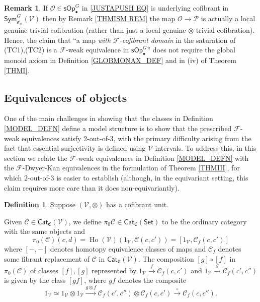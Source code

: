 \documentclass[a4paper,10pt
,draft
]{article}%
\numberwithin{equation}{section}
\numberwithin{figure}{section}
\theoremstyle{definition} %
\newtheorem{definition}[equation]{Definition}%
\newtheorem{remark}[equation]{Remark}%
\newcommand{\Cat}{\mathsf{Cat}}
\DeclareMathOperator{\Ho}{Ho}
\newcommand{\F}{\ensuremath{\mathcal F}}
\newcommand{\V}{\ensuremath{\mathcal V}}
\renewcommand{\O}{\ensuremath{\mathcal O}}
\renewcommand{\P}{\ensuremath{\mathcal P}}
\newcommand{\1}{\ensuremath{\mathbbm 1}}%
\begin{document}
\begin{remark}\label{JCELLSM REM}
	If $\O \in \mathsf{sOp}^G_{\bullet}$
	in \eqref{JUSTAPUSH EQ}
	is underlying cofibrant in $\mathsf{Sym}^G_{\mathfrak{C}_{\O}}(\V)$
	then by Remark \ref{THMISM REM}
	the map $\O \to \P$
	is actually a local genuine trivial cofibration 
	(rather than just a local genuine $\otimes$-trivial cofibration).
	Hence, the claim that 
	``a map \emph{with $\F$-cofibrant domain} in the saturation
	of (TC1),(TC2) is a $\F$-weak equivalence in
	$\mathsf{sOp}^G_{\bullet}$'' 
	does not require the global monoid axiom
	in Definition \ref{GLOBMONAX_DEF} and in (iv) of Theorem \ref{THMI}.
\end{remark}







\subsection{Equivalences of objects}\label{EQUIVOBJ_SEC}



One of the main challenges in showing that the classes in Definition \ref{MODEL_DEFN} define a model structure
is to show that the prescribed 
$\F$-weak equivalences satisfy $2$-out-of-$3$,
with the primary difficulty arising from the fact that essential surjectivity is 
defined using $\V$-intervals.
%
To address this, in this section we relate the $\F$-weak equivalences
in Definition \ref{MODEL_DEFN} with the $\F$-Dwyer-Kan equivalences
in the formulation of Theorem \ref{THMIII},
for which $2$-out-of-$3$ is easier to establish
(although, in the equivariant setting, 
this claim requires more care than it does non-equivariantly).


\begin{definition}\label{HTPY_DEFN}
	Suppose $(\V,\otimes)$ has a cofibrant unit.

	Given $\mathcal C \in \Cat_{\mathfrak{C}}(\V)$,
	we define $\pi_0 \mathcal C \in \Cat_{\mathfrak{C}}(\mathsf{Set})$ 
	to be the ordinary category with the same objects and
\[
	\pi_0(\mathcal{C})(c,d)=
	\Ho(\V)(1_\V, \mathcal C(c,c'))=
	[1_\V, \mathcal{C}_f(c,c')]
\]
where $[-,-]$ denotes homotopy equivalence classes of maps
and $\mathcal{C}_f$ denotes some fibrant replacement of
$\mathcal C$ in $\Cat_{\mathfrak{C}}(\V)$.
The composition $[g]\circ [f]$
in $\pi_0(\mathcal{C})$
of classes $[f],[g]$
represented by
$1_{\mathcal{V}} \xrightarrow{f} \mathcal{C}_f({c,c'})$
and 
$1_{\mathcal{V}} \xrightarrow{g} \mathcal{C}_f({c',c''})$
is given by the class $[gf]$, where $gf$ denotes the composite
\begin{equation}\label{COMPI0 EQ}
1_{\mathcal{V}} \simeq
1_{\mathcal{V}} \otimes 1_{\mathcal{V}} \xrightarrow{g \otimes f}
\mathcal{C}_f({c',c''}) \otimes  \mathcal{C}_f({c,c'}) \xrightarrow{\circ}
\mathcal{C}_f({c,c''}).
\end{equation}
\end{definition}
\end{document}
